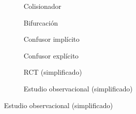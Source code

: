 \begin{figure}[h]
    \begin{subfigure}[b]{0.2\textwidth}
        \centering
        \caption{Colisionador}
        \label{subfig:cd-colisionador}
    \end{subfigure}
    \begin{subfigure}[b]{0.2\textwidth}
        \centering
        \caption{Bifurcación}
        \label{subfig:cd-bifurc}
    \end{subfigure}
    \begin{subfigure}[b]{0.25\textwidth}
        \centering
        \caption{Confusor implícito}
        \label{subfig:confounder}
    \end{subfigure}
    \begin{subfigure}[b]{0.25\textwidth}
        \centering
        \caption{Confusor explícito}
        \label{subfig:confounderFull}
    \end{subfigure}


    \begin{subfigure}[b]{0.45\textwidth}
        \centering
        \caption{RCT (simplificado)}
        \label{subfig:cd-rct}
    \end{subfigure}
    \begin{subfigure}[b]{0.45\textwidth}
        \centering
        \caption{Estudio observacional (simplificado)}
        \label{subfig:observacional}
    \end{subfigure}


\end{figure}
